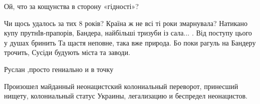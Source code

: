 \begin{itemize}
Ой, что за кощунства в сторону «гідності»?

\obeycr
Чи щось удалось за тих 8 років?
Країна ж не всі ті роки змарнувала?
Натикано купу прутнІв-прапорів,
Бандера, найбільші тризуби із сала...
.
Від поступу цього у душах бринить
Та щастя неповне, така вже природа.
Бо поки рагуль на Бандеру трочить,
Сусіди будують міста та заводи.
\restorecr

Руслан ,просто гениально и в точку


Произошел майданный неонацистский колониальный переворот, принесший нищету,
колониальный статус Украины, легализацию и беспредел неонацистов.

\end{itemize} %

